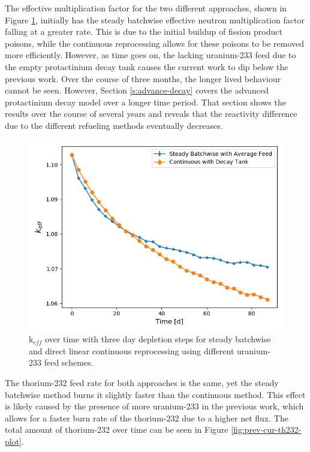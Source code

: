The effective multiplication factor for the two different approaches, shown in Figure \ref{fig:prev-cur-keff-plot}, initially has the steady batchwise effective neutron multiplication factor falling at a greater rate.
This is due to the initial buildup of fission product poisons, while the continuous reprocessing allows for these poisons to be removed more efficiently.
However, as time goes on, the lacking uranium-233 feed due to the empty protactinium decay tank causes the current work to dip below the previous work.
Over the course of three months, the longer lived behaviour cannot be seen.
However, Section \ref{s:advance-decay} covers the advanced protactinium decay model over a longer time period.
That section shows the results over the course of several years and reveals that the reactivity difference due to the different refueling methods eventually decreases.

\begin{figure}[H]
  \centering
  \includegraphics[scale=0.7]{images/prev-cur-keff.png}
  \caption{k$_{eff}$ over time with three day depletion steps for steady batchwise and direct linear continuous reprocessing using different uranium-233 feed schemes.}
   \label{fig:prev-cur-keff-plot}
\end{figure}

The thorium-232 feed rate for both approaches is the same, yet the steady batchwise method burns it slightly faster than the continuous method. This effect is likely caused by the presence of more uranium-233 in the previous work, which allows for a faster burn rate of the thorium-232 due to a higher net flux. The total amount of thorium-232 over time can be seen in Figure \ref{fig:prev-cur-th232-plot}.

